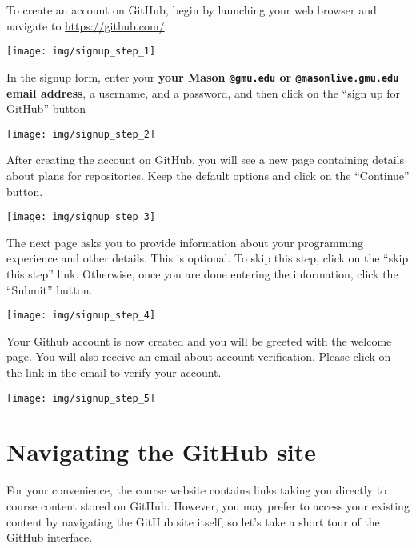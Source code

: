 \documentclass[
]{book}
\begin{document}
To create an account on GitHub, begin by launching your web browser and navigate to \url{https://github.com/}.

\begin{center}\texttt{[image: img/signup\_step\_1]} \end{center}

In the signup form, enter your \textbf{your Mason \texttt{@gmu.edu} or \texttt{@masonlive.gmu.edu} email address}, a username, and a password, and then click on the ``sign up for GitHub'' button

\begin{center}\texttt{[image: img/signup\_step\_2]} \end{center}

After creating the account on GitHub, you will see a new page containing details about plans for repositories.
Keep the default options and click on the ``Continue'' button.

\begin{center}\texttt{[image: img/signup\_step\_3]} \end{center}

The next page asks you to provide information about your programming experience and other details.
This is optional.
To skip this step, click on the ``skip this step'' link.
Otherwise, once you are done entering the information, click the ``Submit'' button.

\begin{center}\texttt{[image: img/signup\_step\_4]} \end{center}

Your Github account is now created and you will be greeted with the welcome page.
You will also receive an email about account verification.
Please click on the link in the email to verify your account.

\begin{center}\texttt{[image: img/signup\_step\_5]} \end{center}

\hypertarget{navigating-the-github-site}{%
\section{Navigating the GitHub site}\label{navigating-the-github-site}}

For your convenience, the course website contains links taking you directly to course content stored on GitHub.
However, you may prefer to access your existing content by navigating the GitHub site itself, so let's take a short tour of the GitHub interface.
\end{document}

